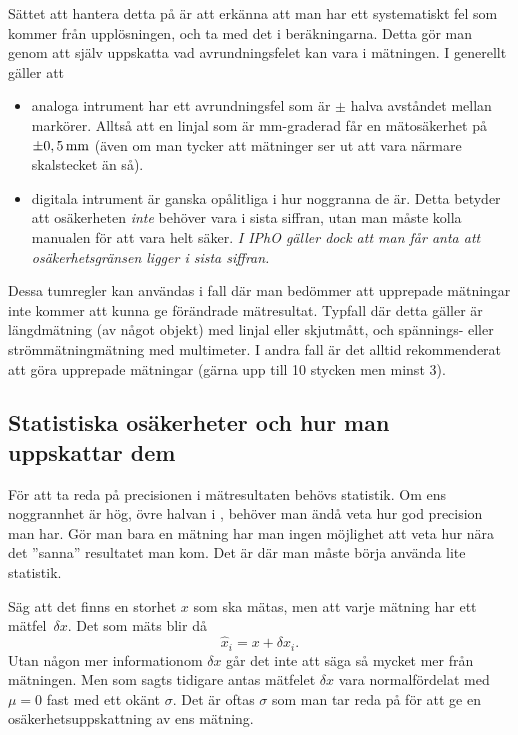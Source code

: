 \documentclass[11pt,a4paper, english, swedish
]{article}
\begin{document}
Sättet att hantera detta på är att erkänna att man har ett
systematiskt fel som kommer från upplösningen, och ta med det i
beräkningarna. Detta gör man genom att själv uppskatta vad
avrundningsfelet kan vara i mätningen. I generellt gäller att
\begin{itemize}
\item analoga intrument har ett avrundningsfel som är $\pm$ halva
  avståndet mellan markörer. Alltså att en linjal som är mm-graderad
  får en mätosäkerhet på $\pm\unit[0,5]{mm}$ (även om man tycker att
  mätninger ser ut att vara närmare skalstecket än så).
\item digitala intrument är ganska opålitliga i hur noggranna de
  är. Detta betyder att osäkerheten \emph{inte} behöver vara i sista
  siffran, utan man måste kolla manualen för att vara helt säker. 
  \emph{I IPhO gäller dock att man får anta att osäkerhetsgränsen
    ligger i sista siffran.} 
\end{itemize}

Dessa tumregler kan användas i fall där man bedömmer att upprepade
mätningar inte kommer att kunna ge förändrade mätresultat. Typfall där
detta gäller är längdmätning (av något objekt) med linjal eller
skjutmått, och spännings- eller strömmätningmätning med multimeter. I
andra fall är det alltid rekommenderat att göra upprepade mätningar
(gärna upp till 10 stycken men minst 3). 


\subsection{Statistiska osäkerheter och hur man uppskattar dem}
För att ta reda på precisionen i mätresultaten behövs statistik. Om
ens noggrannhet är hög, övre halvan i , behöver
man ändå veta hur god precision man har. Gör man bara en mätning har
man ingen möjlighet att veta hur nära det ''sanna'' resultatet man
kom. Det är där man måste börja använda lite statistik. 

Säg att det finns en storhet $x$ som ska mätas, men att varje mätning
har ett mätfel~$\delta{x}$. Det som mäts blir då
\begin{equation}
\hat{x}_i=x+\delta{x}_i.
\end{equation}
Utan någon mer informationom $\delta{x}$ går det inte att säga så mycket mer
från mätningen. Men som sagts tidigare antas mätfelet $\delta{x}$ vara
normalfördelat med $\mu=0$ fast med ett okänt $\sigma$. Det är oftas
$\sigma$ som man tar reda på för att ge en osäkerhetsuppskattning av
ens mätning. 
\end{document}
